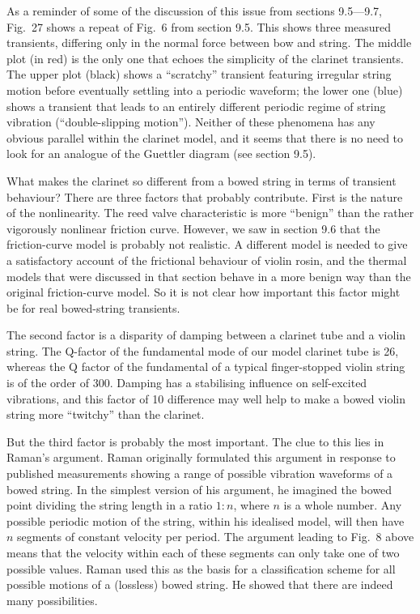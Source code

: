  As a reminder of some of the discussion of this issue from sections 9.5—9.7, 
  Fig.\ 27 shows a repeat of Fig.\ 6 from section 9.5. This shows three 
  measured transients, differing only in the normal force between bow and 
  string. The middle plot (in red) is the only one that echoes the simplicity 
  of the clarinet transients. The upper plot (black) shows a “scratchy” 
  transient featuring irregular string motion before eventually settling into a 
  periodic waveform; the lower one (blue) shows a transient that leads to an 
  entirely different periodic regime of string vibration (“double-slipping 
  motion”). Neither of these phenomena has any obvious parallel within the 
  clarinet model, and it seems that there is no need to look for an analogue of 
  the Guettler diagram (see section 9.5). 


  What makes the clarinet so different from a bowed string in terms of 
  transient behaviour? There are three factors that probably contribute. First 
  is the nature of the nonlinearity. The reed valve characteristic is more 
  ``benign'' than the rather vigorously nonlinear friction curve. However, we 
  saw in section 9.6 that the friction-curve model is probably not realistic. A 
  different model is needed to give a satisfactory account of the frictional 
  behaviour of violin rosin, and the thermal models that were discussed in that 
  section behave in a more benign way than the original friction-curve model. 
  So it is not clear how important this factor might be for real bowed-string 
  transients. 

  The second factor is a disparity of damping between a clarinet tube and a 
  violin string. The Q-factor of the fundamental mode of our model clarinet 
  tube is 26, whereas the Q factor of the fundamental of a typical 
  finger-stopped violin string is of the order of 300. Damping has a 
  stabilising influence on self-excited vibrations, and this factor of 10 
  difference may well help to make a bowed violin string more “twitchy” than 
  the clarinet. 

  But the third factor is probably the most important. The clue to this lies in 
  Raman’s argument. Raman originally formulated this argument in response to 
  published measurements showing a range of possible vibration waveforms of a 
  bowed string. In the simplest version of his argument, he imagined the bowed 
  point dividing the string length in a ratio $1:n$, where $n$ is a whole 
  number. Any possible periodic motion of the string, within his idealised 
  model, will then have $n$ segments of constant velocity per period. The 
  argument leading to Fig.\ 8 above means that the velocity within each of 
  these segments can only take one of two possible values. Raman used this as 
  the basis for a classification scheme for all possible motions of a 
  (lossless) bowed string. He showed that there are indeed many possibilities. 

